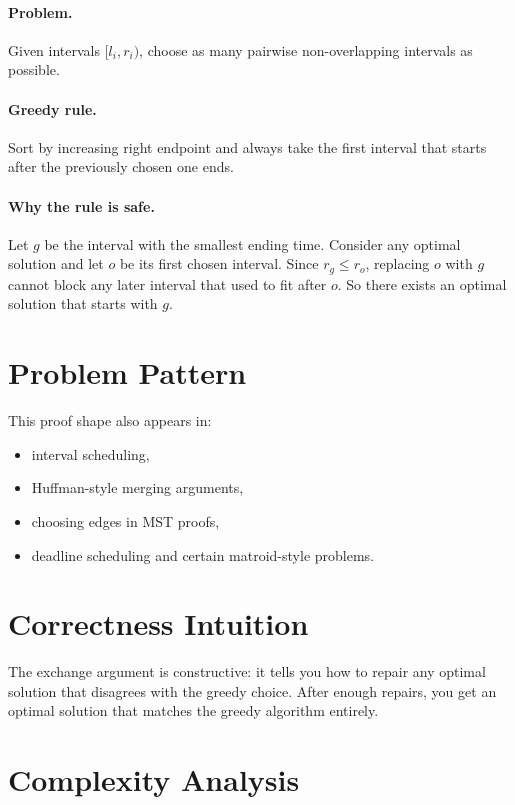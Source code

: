 \paragraph{Problem.}
Given intervals \([l_i, r_i)\), choose as many pairwise non-overlapping intervals as possible.

\paragraph{Greedy rule.}
Sort by increasing right endpoint and always take the first interval that starts after the previously chosen one ends.

\paragraph{Why the rule is safe.}
Let \(g\) be the interval with the smallest ending time. Consider any optimal solution and let \(o\) be its first chosen
interval. Since \(r_g \le r_o\), replacing \(o\) with \(g\) cannot block any later interval that used to fit after
\(o\). So there exists an optimal solution that starts with \(g\).

\section*{Problem Pattern}

This proof shape also appears in:

\begin{itemize}
  \item interval scheduling,
  \item Huffman-style merging arguments,
  \item choosing edges in MST proofs,
  \item deadline scheduling and certain matroid-style problems.
\end{itemize}

\section*{Correctness Intuition}

The exchange argument is constructive: it tells you how to repair any optimal solution that disagrees with the greedy
choice. After enough repairs, you get an optimal solution that matches the greedy algorithm entirely.

\section*{Complexity Analysis}

